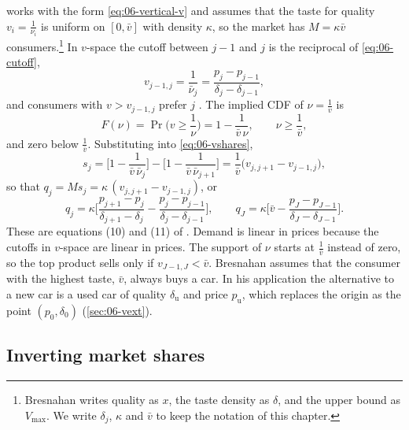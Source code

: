 \begin{example}\label{ex:06-uniform}
\citet{Bresnahan1987} works with the form \eqref{eq:06-vertical-v} and assumes that the taste for quality
$v_i = \frac{1}{\nu_i}$ is uniform on $[0, \bar v]$ with density $\kappa$, so the market has $M = \kappa\bar v$
consumers.\footnote{Bresnahan writes quality as $x$, the taste density as $\delta$, and the upper bound
as $V_{\max}$. We write $\delta_j$, $\kappa$ and $\bar v$ to keep the notation of this chapter.} In
$v$-space the cutoff between $j-1$ and $j$ is the reciprocal of \eqref{eq:06-cutoff},
\begin{equation*}
  v_{j-1,j} = \frac{1}{\bar\nu_j} = \frac{p_j - p_{j-1}}{\delta_j - \delta_{j-1}},
\end{equation*}
and consumers with $v > v_{j-1,j}$ prefer $j$ \citep[eq.~4]{Bresnahan1987}. The implied CDF of
$\nu = \frac{1}{v}$ is
\begin{equation*}
  F(\nu) = \Pr\Big(v \ge \frac{1}{\nu}\Big) = 1 - \frac{1}{\bar v\,\nu}, \qquad \nu \ge \frac{1}{\bar v},
\end{equation*}
and zero below $\frac{1}{\bar v}$. Substituting into \eqref{eq:06-vshares},
\begin{equation*}
  s_j = \Big[1 - \frac{1}{\bar v\,\bar\nu_j}\Big] - \Big[1 - \frac{1}{\bar v\,\bar\nu_{j+1}}\Big]
      = \frac{1}{\bar v}\big(v_{j,j+1} - v_{j-1,j}\big),
\end{equation*}
so that $q_j = M s_j = \kappa\,(v_{j,j+1} - v_{j-1,j})$, or
\begin{equation}\label{eq:06-vuniform-demand}
  q_j = \kappa\Big[\frac{p_{j+1} - p_j}{\delta_{j+1} - \delta_j} - \frac{p_j - p_{j-1}}{\delta_j - \delta_{j-1}}\Big],
  \qquad
  q_J = \kappa\Big[\bar v - \frac{p_J - p_{J-1}}{\delta_J - \delta_{J-1}}\Big].
\end{equation}
These are equations (10) and (11) of \citet{Bresnahan1987}. Demand is linear in prices because the
cutoffs in $v$-space are linear in prices. The support of $\nu$ starts at $\frac{1}{\bar v}$ instead of
zero, so the top product sells only if $v_{J-1,J} < \bar v$. Bresnahan assumes that the consumer with the
highest taste, $\bar v$, always buys a car. In his application the alternative to a new car is a used
car of quality $\delta_{\mathrm u}$ and price $p_{\mathrm u}$, which replaces the origin as the point
$(p_0, \delta_0)$ (\cref{sec:06-vext}).
\end{example}

\subsection{Inverting market shares}\label{sec:06-vinversion}

